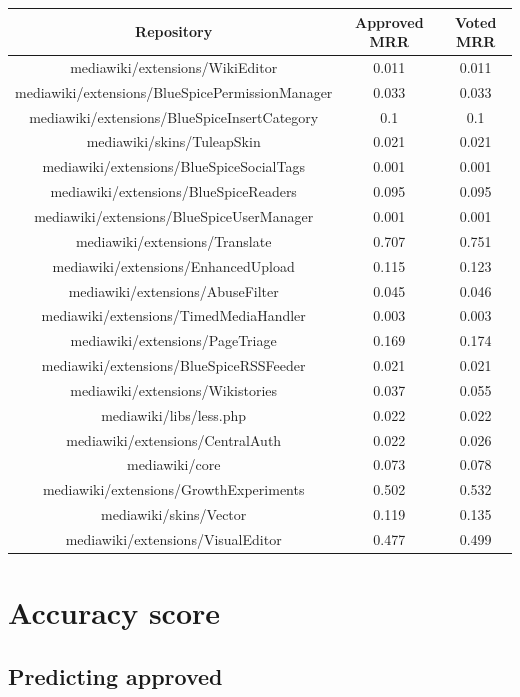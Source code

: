 \begin{center}
\begin{tabular}{@{}c c c@{}} 
 \hline
    \textbf{Repository} & {Approved MRR} & {Voted MRR} \\
\hline
mediawiki/extensions/WikiEditor & 0.011 & 0.011 \\
mediawiki/extensions/BlueSpicePermissionManager & 0.033 & 0.033 \\
mediawiki/extensions/BlueSpiceInsertCategory & 0.1 & 0.1 \\
mediawiki/skins/TuleapSkin & 0.021 & 0.021 \\
mediawiki/extensions/BlueSpiceSocialTags & 0.001 & 0.001 \\
mediawiki/extensions/BlueSpiceReaders & 0.095 & 0.095 \\
mediawiki/extensions/BlueSpiceUserManager & 0.001 & 0.001 \\
mediawiki/extensions/Translate & 0.707 & 0.751 \\
mediawiki/extensions/EnhancedUpload & 0.115 & 0.123 \\
mediawiki/extensions/AbuseFilter & 0.045 & 0.046 \\
mediawiki/extensions/TimedMediaHandler & 0.003 & 0.003 \\
mediawiki/extensions/PageTriage & 0.169 & 0.174 \\
mediawiki/extensions/BlueSpiceRSSFeeder & 0.021 & 0.021 \\
mediawiki/extensions/Wikistories & 0.037 & 0.055 \\
mediawiki/libs/less.php & 0.022 & 0.022 \\
mediawiki/extensions/CentralAuth & 0.022 & 0.026 \\
mediawiki/core & 0.073 & 0.078 \\
mediawiki/extensions/GrowthExperiments & 0.502 & 0.532 \\
mediawiki/skins/Vector & 0.119 & 0.135 \\
mediawiki/extensions/VisualEditor & 0.477 & 0.499 \\
 \hline
\end{tabular}
\end{center}

\section{Accuracy score}
\subsection{Predicting approved}
